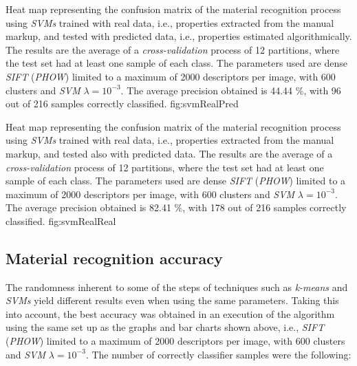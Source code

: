 {Heat map representing the confusion matrix of the material recognition process using \emph{SVMs} trained with real data, i.e., properties extracted from the manual markup, and tested with predicted data, i.e., properties estimated algorithmically. The results are the average of a \emph{cross-validation} process of 12 partitions, where the test set had at least one sample of each class. The parameters used are dense \emph{SIFT} (\emph{PHOW}) limited to a maximum of 2000 descriptors per image, with 600 clusters and \emph{SVM} $\lambda=10^{-3}$. The average precision obtained is 44.44 \%, with 96 out of 216 samples correctly classified.}
{fig:svmRealPred}

{Heat map representing the confusion matrix of the material recognition process using \emph{SVMs} trained with real data, i.e., properties extracted from the manual markup, and tested also with predicted data. The results are the average of a \emph{cross-validation} process of 12 partitions, where the test set had at least one sample of each class. The parameters used are dense \emph{SIFT} (\emph{PHOW}) limited to a maximum of 2000 descriptors per image, with 600 clusters and \emph{SVM} $\lambda=10^{-3}$. The average precision obtained is 82.41 \%, with 178 out of 216 samples correctly classified.}
{fig:svmRealReal}



\subsection{Material recognition accuracy}

The randomness inherent to some of the steps of techniques such as \emph{k-means} and \emph{SVMs} yield different results even when using the same parameters. Taking this into account, the best accuracy was obtained in an execution of the algorithm using the same set up as the graphs and bar charts shown above, i.e., \emph{SIFT} (\emph{PHOW}) limited to a maximum of 2000 descriptors per image, with 600 clusters and \emph{SVM} $\lambda=10^{-3}$. The number of correctly classifier samples were the following:

